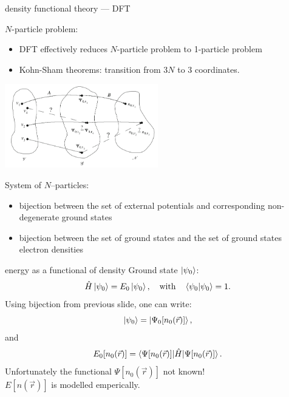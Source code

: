 \documentclass[slovene, usenames,dvipsnames]{beamer}
\begin{document}
  
  \begin{frame}{density functional theory --- DFT}
    \begin{minipage}[]{\textwidth}
      $N$-particle problem:
      \begin{itemize}
      \item DFT effectively reduces $N$-particle problem to 1-particle problem
      \item Kohn-Sham theorems: transition from $3N$ to $3$ coordinates.
      \end{itemize}
    \end{minipage}
    \begin{minipage}[]{\textwidth}
      \centering
      \includegraphics[width=0.5\textwidth]{bijekcija_med_v_psi_n.png}
    \end{minipage}
    System of $N$--particles:
    \begin{itemize}
    \item bijection between the set of external potentials and corresponding
      non-degenerate ground states
    \item bijection between the set of ground states and the set of ground
      states electron densities
    \end{itemize}

  \end{frame}
  
  \begin{frame}{energy as a functional of density}
      \centering
        Ground state $\ket{\psi_0}$:
        \begin{equation} \nonumber
        \hat H \ket{\psi_0} =E_0\ket{ \psi_0},\quad \mathrm{with}
        \quad \braket{\psi_0|\psi_0}=1.
      \end{equation}
          Using bijection from previous slide, one can write:
             \begin{equation} \nonumber
        \ket{\psi_0}=\ket{\Psi_0[n_0(\vec r)]},
      \end{equation}
        and
      \begin{equation} \nonumber
        E_0[n_0(\vec r)]=\braket{\Psi[n_0(\vec r)]|\hat H|\Psi[n_0(\vec r)]}.
      \end{equation}
    \centering
      Unfortunately the functional $\Psi[n_0(\vec r)]$ not known!
    \\
       $E[n(\vec r)]$ is modelled emperically.
  \end{frame}
\end{document}

